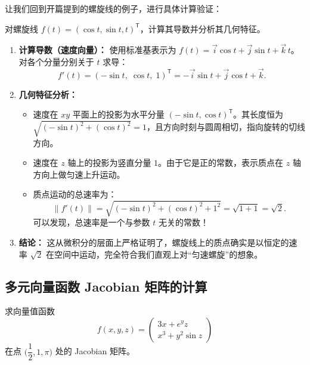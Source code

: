\documentclass[lang=cn,11pt]{elegantbook}
\begin{document}
让我们回到开篇提到的螺旋线的例子，进行具体计算验证：

\begin{exercise}[螺旋线的速度向量] \label{ex:helix-velocity}
对螺旋线 $f(t)=(\cos t,\sin t,t)^{\mathsf T}$，计算其导数并分析其几何特征。
\end{exercise}

\begin{solution}
\begin{enumerate}
  \item \textbf{计算导数（速度向量）：}
  使用标准基表示为 $f(t)=\vec i\cos t+\vec j\sin t+\vec k\,t$。
  对各个分量分别关于 $t$ 求导：
  \[
  f'(t)=(-\sin t,\;\cos t,\;1)^{\mathsf T}
       =-\vec i\sin t+\vec j\cos t+\vec k.
  \]
  
  \item \textbf{几何特征分析：}
  \begin{itemize}
    \item 速度在 $xy$ 平面上的投影为水平分量 $(-\sin t,\cos t)^{\mathsf T}$。其长度恒为 $\sqrt{(-\sin t)^2+(\cos t)^2}=1$，且方向时刻与圆周相切，指向旋转的切线方向。
    \item 速度在 $z$ 轴上的投影为竖直分量 $1$。由于它是正的常数，表示质点在 $z$ 轴方向上做匀速上升运动。
    \item 质点运动的总速率为：
    \[
    \|f'(t)\|=\sqrt{(-\sin t)^2+(\cos t)^2+1^2}=\sqrt{1+1}=\sqrt{2}.
    \]
    可以发现，总速率是一个与参数 $t$ 无关的常数！
  \end{itemize}
  
  \item \textbf{结论：}
  这从微积分的层面上严格证明了，螺旋线上的质点确实是以恒定的速率 $\sqrt{2}$ 在空间中运动，完全符合我们直观上对“匀速螺旋”的想象。
\end{enumerate}
\end{solution}


\subsection{多元向量函数 Jacobian 矩阵的计算}

\begin{exercise} \label{ex:jacobian-compute}
求向量值函数
\[
f(x,y,z)=\begin{pmatrix}
3x+e^y z\\
x^3+y^2\sin z
\end{pmatrix}
\]
在点 $\bigl(\dfrac12,1,\pi\bigr)$ 处的 Jacobian 矩阵。
\end{exercise}
\end{document}

